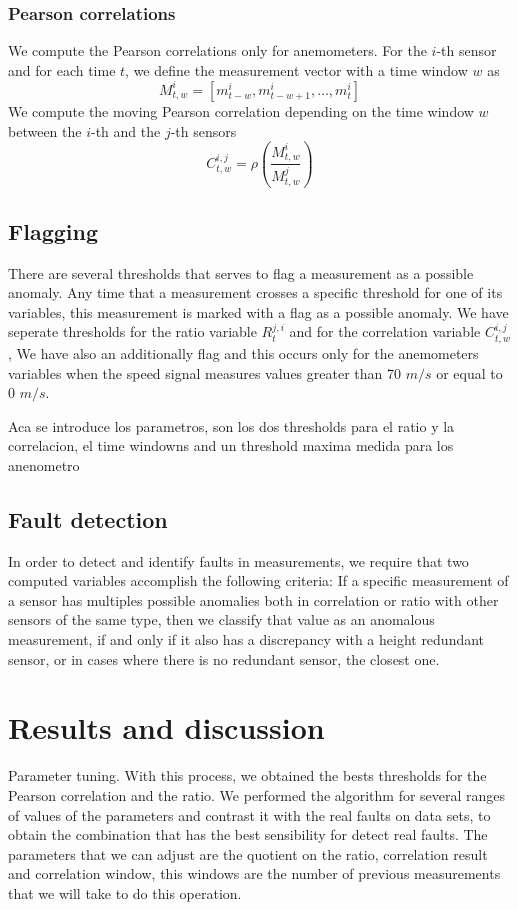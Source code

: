 \documentclass[journal]{IEEEtran}
\begin{document}
\subsubsection{Pearson correlations}
We compute the Pearson correlations only for anemometers. For the $i$-th sensor and for each time $t$, we define the measurement vector with a time window $w$ as 
\begin{equation}
M^i_{t,w} = [m_{t-w}^i,m_{t-w+1}^i,\ldots,m_t^i]
\end{equation}
We compute the moving Pearson correlation depending on the time window $w$ between the $i$-th and the $j$-th sensors
\begin{equation}
C^{i,j}_{t,w}= \rho\left( \frac{M^i_{t,w}}{M^j_{t,w}}\right)
\end{equation}

\subsection{Flagging}\label{subsec:flagging}
There are several thresholds that serves to flag a measurement as a possible anomaly. Any time that  a measurement crosses a specific threshold for one of its variables, this measurement is marked with a flag as a possible anomaly. 
We have seperate  thresholds for the ratio variable  $R_{t}^{j,i}$  and for the correlation variable $C^{i,j}_{t,w}$,
We have also an additionally flag and this occurs only for the anemometers variables when the speed signal measures values greater than 70 $m/s$ or equal to 0 $m/s$.


Aca se introduce los parametros, son los dos thresholds para el ratio y la correlacion, el time windowns and un threshold maxima medida para los anenometro


\subsection{Fault detection}\label{subsec:faultdetection}
In order to detect and identify faults in measurements, we require that two computed variables accomplish the following criteria: If a specific measurement of a sensor has multiples possible anomalies both in correlation or ratio with other sensors of the same type, then we classify that value as an anomalous measurement, if and only if it also has a discrepancy with a height redundant sensor, or in cases where there is no redundant sensor, the closest one.




\section{Results and discussion}\label{sec:results}
Parameter tuning.
With this process, we obtained the bests thresholds for the Pearson correlation and the ratio. We performed the algorithm for several ranges of values of the parameters and contrast it with the real faults on data sets, to obtain the combination that has the best sensibility for detect real faults. The parameters that we can adjust are the quotient on the ratio, correlation result and correlation window, this windows are the number of previous measurements that we will take to do this operation.
\end{document}
